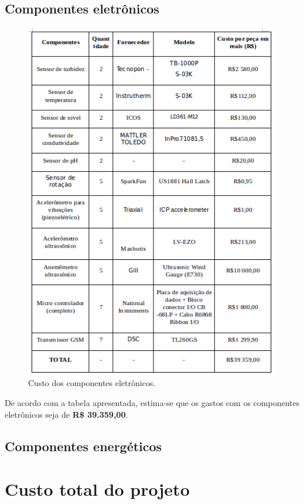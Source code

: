       \subsection{Componentes eletrônicos}
	
	\FloatBarrier
	\begin{figure}[!h]
	    \centering
	    \includegraphics[scale = 0.80]{editaveis/figuras/custos_componentes_eletronicos}
	    \caption[Custo dos componentes eletrônicos]{Custo dos componentes eletrônicos.}
	    \label{custos_componentes_eletronicos}
	\end{figure}
	
	De acordo com a tabela apresentada, estima-se que os gastos com os componentes eletrônicos seja de \textbf{R\$ 39.359,00}.
	
      \subsection{Componentes energéticos}
    
    \section{Custo total do projeto}
      
